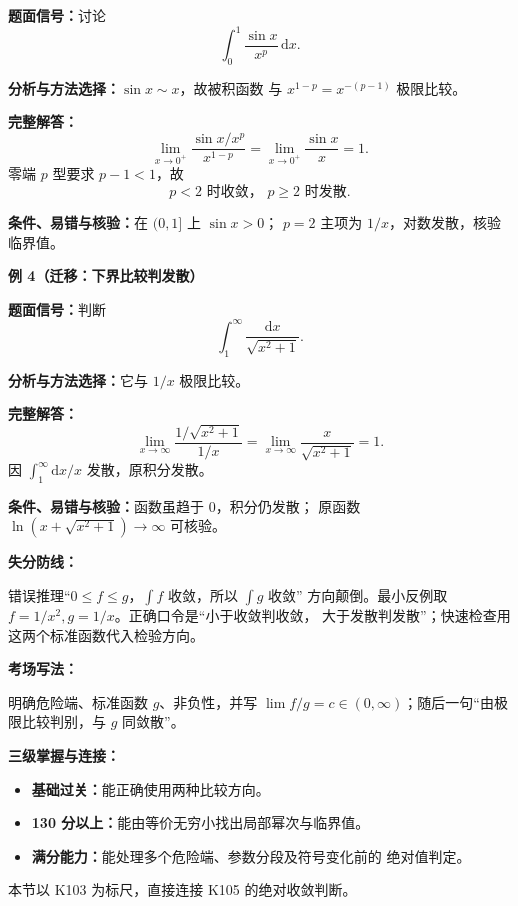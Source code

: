 \begin{knowledgeBox}
\textbf{题面信号：}讨论
\[
\int_0^1\frac{\sin x}{x^p}\,\mathrm dx.
\]

\textbf{分析与方法选择：}\(\sin x\sim x\)，故被积函数
与 \(x^{1-p}=x^{-(p-1)}\) 极限比较。

\textbf{完整解答：}
\[
\lim_{x\to0^+}
\frac{\sin x/x^p}{x^{1-p}}
=\lim_{x\to0^+}\frac{\sin x}{x}=1.
\]
零端 \(p\) 型要求 \(p-1<1\)，故
\[
\boxed{p<2\text{ 时收敛， }p\ge2\text{ 时发散}.}
\]

\textbf{条件、易错与核验：}在 \((0,1]\) 上 \(\sin x>0\)；
\(p=2\) 主项为 \(1/x\)，对数发散，核验临界值。

\textbf{例 4（迁移：下界比较判发散）}

\textbf{题面信号：}判断
\[
\int_1^\infty\frac{\mathrm dx}{\sqrt{x^2+1}}.
\]

\textbf{分析与方法选择：}它与 \(1/x\) 极限比较。

\textbf{完整解答：}
\[
\lim_{x\to\infty}
\frac{1/\sqrt{x^2+1}}{1/x}
=\lim_{x\to\infty}\frac{x}{\sqrt{x^2+1}}=1.
\]
因 \(\int_1^\infty\mathrm dx/x\) 发散，原积分发散。

\textbf{条件、易错与核验：}函数虽趋于 \(0\)，积分仍发散；
原函数 \(\ln(x+\sqrt{x^2+1})\to\infty\) 可核验。

\textbf{失分防线：}

错误推理“\(0\le f\le g\)，\(\int f\) 收敛，所以 \(\int g\) 收敛”
方向颠倒。最小反例取 \(f=1/x^2,g=1/x\)。正确口令是“小于收敛判收敛，
大于发散判发散”；快速检查用这两个标准函数代入检验方向。

\textbf{考场写法：}

明确危险端、标准函数 \(g\)、非负性，并写
\(\lim f/g=c\in(0,\infty)\)；随后一句“由极限比较判别，与 \(g\)
同敛散”。

\textbf{三级掌握与连接：}
\begin{itemize}
  \item \textbf{基础过关：}能正确使用两种比较方向。
  \item \textbf{130 分以上：}能由等价无穷小找出局部幂次与临界值。
  \item \textbf{满分能力：}能处理多个危险端、参数分段及符号变化前的
  绝对值判定。
\end{itemize}
本节以 K103 为标尺，直接连接 K105 的绝对收敛判断。
\end{knowledgeBox}


\par

